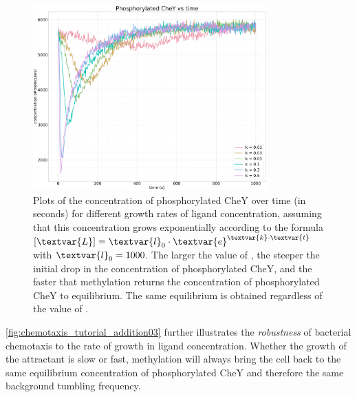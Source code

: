 \begin{figure}[h]
\centering
\mySfFamily
\includegraphics[width = 0.8\textwidth]{../images/chemotaxis_tutorial_addition03.png}
\caption{Plots of the concentration of phosphorylated CheY over time (in seconds) for different growth rates  of ligand concentration, assuming that this concentration grows exponentially according to the formula  $[\textvar{L}] = \textvar{l}_\text{0} \cdot \textvar{e}^{\textvar{k} \cdot \textvar{t}}$ with $\textvar{l}_\text{0} = \text{1000}$. The larger the value of , the steeper the initial drop in the concentration of phosphorylated CheY, and the faster that methylation returns the concentration of phosphorylated CheY to equilibrium. The same equilibrium is obtained regardless of the value of .}
\label{fig:chemotaxis_tutorial_addition03}
\end{figure}

\autoref{fig:chemotaxis_tutorial_addition03} further illustrates the \textit{robustness} of bacterial chemotaxis to the rate of growth in ligand concentration. Whether the growth of the attractant is slow or fast, methylation will always bring the cell back to the same equilibrium concentration of phosphorylated CheY and therefore the same background tumbling frequency.\\

\begin{qbox}\end{qbox}

